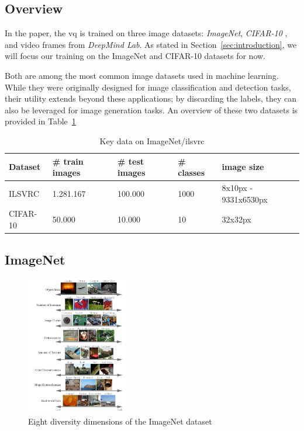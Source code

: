 \subsection{Overview}\label{subsec:dataset-overview}
In the paper, the \ac{vq} is trained on three image datasets: \textit{ImageNet}, \textit{CIFAR-10}
, and video frames from \textit{DeepMind Lab}.
As stated in Section~\ref{sec:introduction}, we will focus our training on the ImageNet and CIFAR-10
datasets for now.

Both are among the most common image datasets used in machine learning.
While they were originally designed for image classification and detection tasks, their utility extends beyond
these applications; by discarding the labels, they can also be leveraged for image generation tasks.
An overview of these two datasets is provided in Table~\ref{tab:datasets}

\begin{table}[ht]
    \begin{tabular}{lllll}
        Dataset  & \# train images & \# test images & \# classes & image size           \\ \hline \hline
        ILSVRC   & 1.281.167       & 100.000        & 1000       & 8x10px - 9331x6530px \\
        CIFAR-10 & 50.000          & 10.000         & 10         & 32x32px              \\ \hline \hline
    \end{tabular}
    \caption{Key data on ImageNet/\ac{ilsvrc}}
    \label{tab:datasets}
\end{table}

\subsection{ImageNet}\label{subsec:imagenet}

\begin{figure}
    \centering
    \includegraphics[width=0.4\textwidth]{../../sample_images/imnet_dimension}
    \caption{Eight diversity dimensions of the ImageNet dataset~\cite{imagenet_breakdown}}
    \label{fig:imnet_dimensions}
\end{figure}

